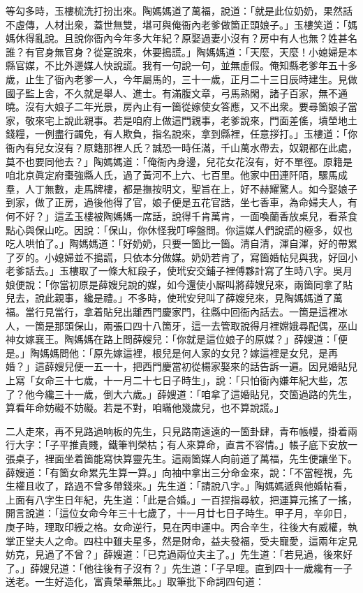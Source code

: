 等勾多時，玉樓梳洗打扮出來。陶媽媽道了萬福，說道：「就是此位奶奶，果然話不虛傳，人材出衆，蓋世無雙，堪可與俺衙內老爹做箇正頭娘子。」玉樓笑道：「媽媽休得亂說。且說你衙內今年多大年紀？原娶過妻小沒有？房中有人也無？姓甚名誰？有官身無官身？從寔說來，休要搗謊。」陶媽媽道：「天麼，天麼！小媳婦是本縣官媒，不比外邊媒人快說謊。我有一句說一句，並無虛假。俺知縣老爹年五十多歲，止生了衙內老爹一人，今年屬馬的，三十一歲，正月二十三日辰時建生。見做國子監上舍，不久就是舉人、進士。{}有滿腹文章，弓馬熟閑，諸子百家，無不通曉。沒有大娘子二年光景，房內止有一箇從嫁使女答應，又不出衆。要尋箇娘子當家，敬來宅上說此親事。若是咱府上做這門親事，老爹說來，門面差傜，墳塋地土錢糧，一例盡行蠲免，有人欺負，指名說來，拿到縣裡，任意拶打。」玉樓道：「你衙內有兒女沒有？原籍那裡人氏？誠恐一時任滿，千山萬水帶去，奴親都在此處，莫不也要同他去？」陶媽媽道：「俺衙內身邊，兒花女花沒有，好不單徑。原籍是咱北京眞定府棗強縣人氏，過了黃河不上六、七百里。他家中田連阡陌，騾馬成羣，人丁無數，走馬牌樓，都是撫按明文，聖旨在上，好不赫耀驚人。如今娶娘子到家，做了正房，過後他得了官，娘子便是五花官誥，坐七香車，為命婦夫人，有何不好？」{}這孟玉樓被陶媽媽一席話，說得千肯萬肯，一面喚蘭香放桌兒，看茶食點心與保山吃。因說：「保山，你休怪我叮嚀盤問。你這媒人們說謊的極多，奴也吃人哄怕了。」{}陶媽媽道：「好奶奶，只要一箇比一箇。清自清，渾自渾，好的帶累了歹的。小媳婦並不搗謊，只依本分做媒。奶奶若肯了，寫箇婚帖兒與我，好回小老爹話去。」玉樓取了一條大紅段子，使玳安交鋪子裡傅夥計寫了生時八字。吳月娘便說：「你當初原是薛嫂兒說的媒，如今還使小厮叫將薛嫂兒來，兩箇同拿了貼兒去，說此親事，纔是禮。」不多時，使玳安兒叫了薛嫂兒來，見陶媽媽道了萬福。當行見當行，拿着貼兒出離西門慶家門，往縣中回衙內話去。一箇是這裡冰人，一箇是那頭保山，兩張口四十八箇牙，這一去管取說得月裡嫦娥尋配偶，巫山神女嫁襄王。陶媽媽在路上問薛嫂兒：「你就是這位娘子的原媒？」薛嫂道：「便是。」陶媽媽問他：「原先嫁這裡，根兒是何人家的女兒？嫁這裡是女兒，是再婚？」這薛嫂兒便一五一十，把西門慶當初從楊家娶來的話告訴一遍。因見婚貼兒上寫「女命三十七歲，十一月二十七日子時生」，說：「只怕衙內嫌年紀大些，怎了？他今纔三十一歲，倒大六歲。」薛嫂道：「咱拿了這婚貼兒，交箇過路的先生，算看年命妨礙不妨礙。若是不對，咱瞞他幾歲兒，也不算說謊。」{}

二人走來，再不見路過响板的先生，只見路南遠遠的一箇卦肆，青布帳幔，掛着兩行大字：「子平推貴賤，鐵筆判榮枯；有人來算命，直言不容情。」帳子底下安放一張桌子，裡面坐着箇能寫快算靈先生。這兩箇媒人向前道了萬福，先生便讓坐下。薛嫂道：「有箇女命累先生算一算。」向袖中拿出三分命金來，說：「不當輕視，先生權且收了，路過不曾多帶錢來。」先生道：「請說八字。」陶媽媽遞與他婚帖看，上面有八字生日年紀，先生道：「此是合婚。」一百捏指尋紋，把運算元搖了一搖，開言說道：「這位女命今年三十七歲了，十一月廿七日子時生。甲子月，辛卯日，庚子時，理取印綬之格。女命逆行，見在丙申運中。丙合辛生，往後大有威權，執掌正堂夫人之命。四柱中雖夫星多，然是財命，益夫發福，受夫寵愛，這兩年定見妨克，見過了不曾？」薛嫂道：「已克過兩位夫主了。」先生道：「若見過，後來好了。」薛嫂兒道：「他往後有子沒有？」先生道：「子早哩。直到四十一歲纔有一子送老。一生好造化，富貴榮華無比。」{}取筆批下命詞四句道：

